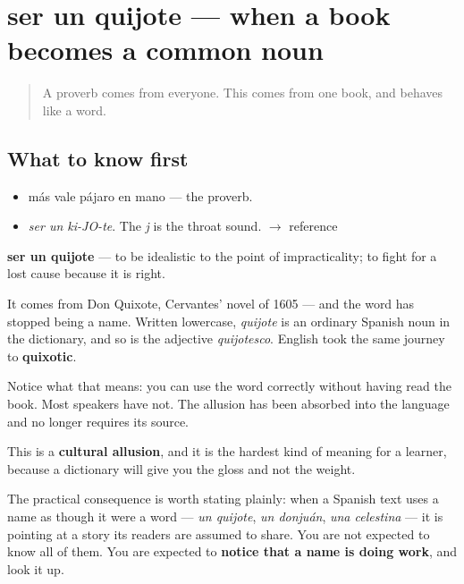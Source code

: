 \section[ser un quijote]{ser un quijote — when a book becomes a common noun}

\label{lesson:ES-C274-ser-un-quijote}



\begin{quote}
A proverb comes from everyone. This comes from one book, and behaves like a word.
\end{quote}

\subsection*{What to know first}
\begin{itemize}
\raggedright
  \item más vale pájaro en mano — the proverb.
\end{itemize}

\begin{sounds}
\begin{itemize}
\raggedright
  \item \emph{ser un ki-JO-te}. The \emph{j} is the throat sound. $\to$ reference
\end{itemize}
\end{sounds}

\begin{cousinweb}
\textbf{ser un quijote} — to be idealistic to the point of impracticality; to fight for a lost cause because it is right.

It comes from Don Quixote, Cervantes' novel of 1605 — and the word has stopped being a name. Written lowercase, \emph{quijote} is an ordinary Spanish noun in the dictionary, and so is the adjective \emph{quijotesco}. English took the same journey to \textbf{quixotic}.

Notice what that means: you can use the word correctly without having read the book. Most speakers have not. The allusion has been absorbed into the language and no longer requires its source.
\end{cousinweb}

\begin{grammarlens}[title={What you've built}]
This is a \textbf{cultural allusion}, and it is the hardest kind of meaning for a learner, because a dictionary will give you the gloss and not the weight.

The practical consequence is worth stating plainly: when a Spanish text uses a name as though it were a word — \emph{un quijote}, \emph{un donjuán}, \emph{una celestina} — it is pointing at a story its readers are assumed to share. You are not expected to know all of them. You are expected to \textbf{notice that a name is doing work}, and look it up.
\end{grammarlens}

